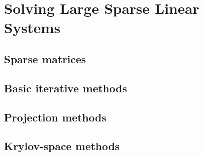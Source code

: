 \chapter{Solving Large Sparse Linear Systems}
\label{chap:sparse}

\section{Sparse matrices}



\section{Basic iterative methods}


\section{Projection methods}


\section{Krylov-space methods}



